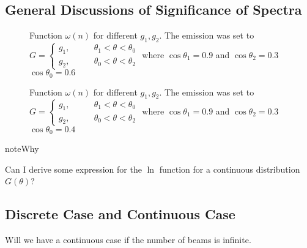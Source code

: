 \documentclass[letterpaper,12pt,english]{sphinxmanual}
\begin{document}
\subsection{General Discussions of Significance of Spectra}
\label{\detokenize{collective/dispersion-relation:general-discussions-of-significance-of-spectra}}\begin{figure}[htbp]
\centering
\capstart

\noindent{}
\caption{Function \(\omega(n)\) for different \(g_1,g_2\). The emission was set to \(G=\begin{cases}
g_1, \qquad & \theta_1<\theta<\theta_0 \\
g_2, \qquad & \theta_0<\theta<\theta_2
\end{cases}\) where \(\cos\theta_1=0.9\) and \(\cos\theta_2=0.3\) \(\cos\theta_0=0.6\)}\label{\detokenize{collective/dispersion-relation:id15}}\end{figure}
\begin{figure}[htbp]
\centering
\capstart

\noindent{}
\caption{Function \(\omega(n)\) for different \(g_1,g_2\). The emission was set to \(G=\begin{cases}
g_1, \qquad & \theta_1<\theta<\theta_0 \\
g_2, \qquad & \theta_0<\theta<\theta_2
\end{cases}\) where \(\cos\theta_1=0.9\) and \(\cos\theta_2=0.3\) \(\cos\theta_0=0.4\)}\label{\detokenize{collective/dispersion-relation:id16}}\end{figure}

\begin{sphinxadmonition}{note}{Why}

Can I derive some expression for the \(\ln\) function for a continuous distribution \(G(\theta)\)?
\end{sphinxadmonition}


\subsection{Discrete Case and Continuous Case}
\label{\detokenize{collective/dispersion-relation:discrete-case-and-continuous-case}}
Will we have a continuous case if the number of beams is infinite.
\end{document}
